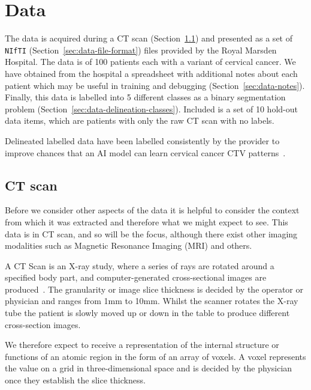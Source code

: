 \documentclass[11pt,twoside]{report}
\begin{document}

\chapter{Data}\label{sect:data}

The data is acquired during a CT scan (Section~\ref{sec:data-ct-scan}) and presented as a set of \texttt{NIfTI} (Section~\ref{sec:data-file-format}) files provided by the Royal Marsden Hospital. The data is of 100 patients each with a variant of cervical cancer. We have obtained from the hospital a spreadsheet with additional notes about each patient which may be useful in training and debugging (Section~\ref{sec:data-notes}). Finally, this data is labelled into 5 different classes as a binary segmentation problem (Section~\ref{sec:data-delineation-classes}). Included is a set of 10 hold-out data items, which are patients with only the raw CT scan with no labels.

Delineated labelled data have been labelled consistently by the provider to improve chances that an AI model can learn cervical cancer CTV patterns~\cite{AMLART-data}.

\section{CT scan}\label{sec:data-ct-scan}

Before we consider other aspects of the data it is helpful to consider the context from which it was extracted and therefore what we might expect to see. This data is in CT scan, and so will be the focus, although there exist other imaging modalities such as Magnetic Resonance Imaging (MRI) and others.

A CT Scan is an X-ray study, where a series of rays are rotated around a specified body part, and computer-generated cross-sectional images are produced~\cite{file-formats}. The granularity or image slice thickness is decided by the operator or physician and ranges from 1mm to 10mm. Whilst the scanner rotates the X-ray tube the patient is slowly moved up or down in the table to produce different cross-section images.

We therefore expect to receive a representation of the internal structure or functions of an atomic region in the form of an array of voxels. A voxel represents the value on a grid in three-dimensional space and is decided by the physician once they establish the slice thickness.
\end{document}

